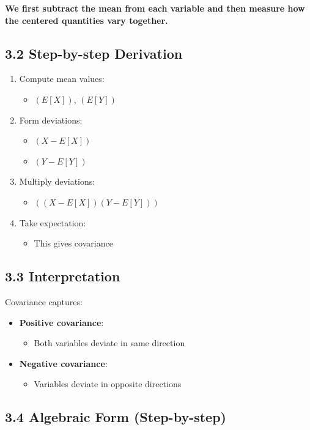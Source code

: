 \documentclass[12pt]{article}
\begin{document}
\textbf{We first subtract the mean from each variable and then measure how the centered quantities vary together.}

\subsection*{3.2 Step-by-step Derivation}

\begin{enumerate}
\item Compute mean values:
\begin{itemize}
\item $(E[X])$, $(E[Y])$
\end{itemize}
\item Form deviations:
\begin{itemize}
\item $(X - E[X])$
\item $(Y - E[Y])$
\end{itemize}
\item Multiply deviations:
\begin{itemize}
\item $((X - E[X])(Y - E[Y]))$
\end{itemize}
\item Take expectation:
\begin{itemize}
\item This gives covariance
\end{itemize}
\end{enumerate}

\subsection*{3.3 Interpretation}

Covariance captures:
\begin{itemize}
\item \textbf{Positive covariance}:
\begin{itemize}
\item Both variables deviate in same direction
\end{itemize}
\item \textbf{Negative covariance}:
\begin{itemize}
\item Variables deviate in opposite directions
\end{itemize}
\end{itemize}

\subsection*{3.4 Algebraic Form (Step-by-step)}
\end{document}
